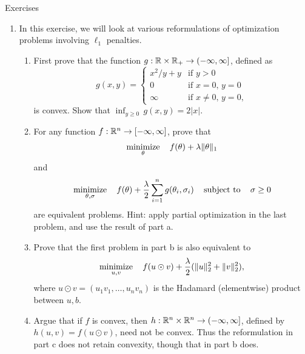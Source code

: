 \begin{xcb}{Exercises}
\begin{enumerate}[label=\thechapter.\arabic*]
\begin{enumerate}[label=\alph*.]
\item Give an example to show that the inequality in part d can be loose, in
  general. 
\end{enumerate}

\smallskip
A remark on the interpretation: in the language of duality, covered in Chapter
\ref{sec:lagrangian_duality}, part d says that weak duality holds in general,
for any optimization problem; and part e reminds us that strong duality need not 
hold in general, without further assumptions.    

\item In this exercise, we will look at various reformulations of optimization
  problems involving $\ell_1$ penalties.
  
\begin{enumerate}[label=\alph*.]
\item First prove that the function $g : \mathbb{R} \times \mathbb{R}_+ \to (-\infty,\infty]$, 
  defined as  
  \[
  g(x,y) = \begin{cases}
  x^2/y + y & \text{if $y > 0$} \\
  0 & \text{if $x=0, \, y=0$} \\
  \infty & \text{if $x\not=0, \, y=0$},
  \end{cases}
  \]
  is convex. Show that $\inf_{y \geq 0} \, g(x,y) = 2|x|$. 

\item For any function $f : \mathbb{R}^n \to [-\infty,\infty]$, prove that 
  \[
  \operatorname*{minimize}_\theta \quad f(\theta) + \lambda \|\theta\|_1 
  \]
  and 
  \[
  \operatorname*{minimize}_{\theta, \sigma} \quad f(\theta) + \frac{\lambda}{2} \sum_{i=1}^n 
  g(\theta_i, \sigma_i) \quad \operatorname{subject\,\,to} \quad \sigma \geq 0
  \]
  are equivalent problems. Hint: apply partial optimization in the last problem,  
  and use the result of part a.

\item Prove that the first problem in part b is also equivalent to 
  \[
  \operatorname*{minimize}_{u,v} \quad f(u \odot v) + \frac{\lambda}{2} (\|u\|_2^2 +
  \|v\|_2^2), 
  \]
  where $u \odot v = (u_1v_1, \dots, u_nv_n)$ is the Hadamard
  (elementwise) product between $u,b$. 

\item Argue that if $f$ is convex, then $h : \mathbb{R}^n \times \mathbb{R}^n \to
  (-\infty,\infty]$, defined by $h(u,v) = f(u \odot v)$, need not be
  convex. Thus the reformulation in part c does not retain convexity, though
  that in part b does. 
\end{enumerate}


\end{enumerate}
\end{xcb}

